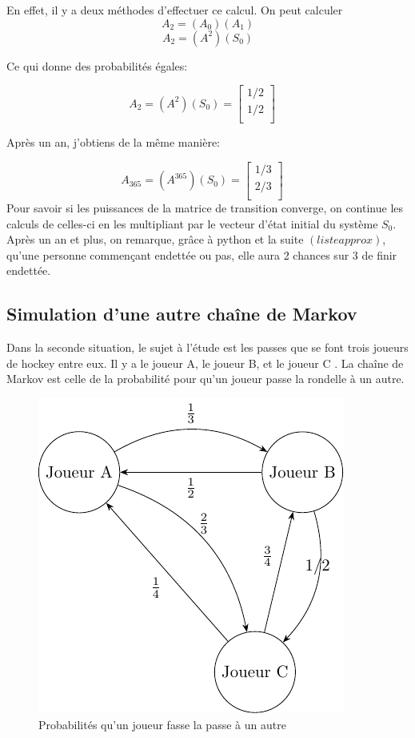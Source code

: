 \documentclass[10pt]{article}
\begin{document}
En effet, il y a deux méthodes d'effectuer ce calcul. On peut calculer 
\[
A_2 = (A_0)(A_1)
\]
\[
A_2 = (A^2)(S_0)
\]

Ce qui donne des probabilités égales:

\[
A_2 = (A^2)(S_0) = 	\begin{bmatrix} 
	1/2\\ 
	1/2\\
	\end{bmatrix}
	\quad
\]



Après un an, j'obtiens de la même manière:

\[
A_{365} = (A^{365})(S_0) = 	\begin{bmatrix} 
	1/3\\ 
	2/3\\
	\end{bmatrix}
	\quad
\]
Pour savoir si les puissances de la matrice de transition converge, on continue les calculs de celles-ci en les multipliant par le vecteur d'état initial du système $S_0$.
Après un an et plus, on remarque, grâce à python et la suite $(listeapprox)$, qu'une personne commençant endettée ou pas, elle aura 2 chances sur 3 de finir endettée.

\subsection{Simulation d'une autre chaîne de Markov}


Dans la seconde situation, le sujet à l'étude est les passes que se font trois joueurs de hockey entre eux. Il y a le joueur A, le joueur B, et le joueur C \cite{hockey}. La chaîne de Markov est celle de la probabilité pour qu'un joueur passe la rondelle à un autre.

\begin{figure}[H]
	\centering
	\includegraphics[scale=0.8]{pichockey.pdf}
	\caption{Probabilités qu'un joueur fasse la passe à un autre}
\end{figure}
\end{document}
